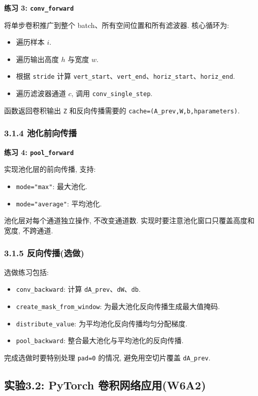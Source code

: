 \documentclass{../../nndlcourse}
\begin{document}
\textbf{练习 3: \texttt{conv\_forward}}

将单步卷积推广到整个 batch、所有空间位置和所有滤波器. 核心循环为:
\begin{itemize}
    \item 遍历样本 $i$.
    \item 遍历输出高度 $h$ 与宽度 $w$.
    \item 根据 \texttt{stride} 计算 \texttt{vert\_start}、\texttt{vert\_end}、\texttt{horiz\_start}、\texttt{horiz\_end}.
    \item 遍历滤波器通道 $c$, 调用 \texttt{conv\_single\_step}.
\end{itemize}
函数返回卷积输出 \texttt{Z} 和反向传播需要的 \texttt{cache=(A\_prev,W,b,hparameters)}.

\subsubsection*{3.1.4 池化前向传播}

\textbf{练习 4: \texttt{pool\_forward}}

实现池化层的前向传播, 支持:
\begin{itemize}
    \item \texttt{mode="max"}: 最大池化.
    \item \texttt{mode="average"}: 平均池化.
\end{itemize}
池化层对每个通道独立操作, 不改变通道数. 实现时要注意池化窗口只覆盖高度和宽度, 不跨通道.

\subsubsection*{3.1.5 反向传播(选做)}

选做练习包括:
\begin{itemize}
    \item \texttt{conv\_backward}: 计算 \texttt{dA\_prev}、\texttt{dW}、\texttt{db}.
    \item \texttt{create\_mask\_from\_window}: 为最大池化反向传播生成最大值掩码.
    \item \texttt{distribute\_value}: 为平均池化反向传播均匀分配梯度.
    \item \texttt{pool\_backward}: 整合最大池化与平均池化的反向传播.
\end{itemize}
完成选做时要特别处理 \texttt{pad=0} 的情况, 避免用空切片覆盖 \texttt{dA\_prev}.

\subsection*{实验3.2: PyTorch 卷积网络应用(W6A2)}
\end{document}
